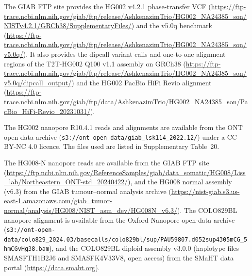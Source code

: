 The GIAB FTP site provides the HG002 v4.2.1 phase-transfer VCF (\url{https://ftp-trace.ncbi.nlm.nih.gov/giab/ftp/release/AshkenazimTrio/HG002_NA24385_son/NISTv4.2.1/GRCh38/SupplementaryFiles/}) and the v5.0q benchmark (\url{https://ftp-trace.ncbi.nlm.nih.gov/giab/ftp/release/AshkenazimTrio/HG002_NA24385_son/v5.0q/}). It also provides the dipcall variant calls and one-to-one alignment regions of the T2T-HG002 Q100 v1.1 assembly on GRCh38 (\url{https://ftp-trace.ncbi.nlm.nih.gov/giab/ftp/release/AshkenazimTrio/HG002_NA24385_son/v5.0q/dipcall_output/}) and the HG002 PacBio HiFi Revio alignment (\url{https://ftp-trace.ncbi.nlm.nih.gov/giab/ftp/data/AshkenazimTrio/HG002_NA24385_son/PacBio_HiFi-Revio_20231031/}).

The HG002 nanopore R10.4.1 reads and alignments are available from the ONT open-data archive (\texttt{s3://ont-open-data/giab\_lsk114\_2022.12/}) under a CC BY-NC 4.0 licence. The files used are listed in Supplementary Table~20.

The HG008-N nanopore reads are available from the GIAB FTP site (\url{https://ftp.ncbi.nlm.nih.gov/ReferenceSamples/giab/data_somatic/HG008/Liss_lab/Northeastern_ONT-std_20240422/}), and the HG008 normal assembly (v6.3) from the GIAB tumour--normal analysis archive (\url{https://nist-giab.s3.us-east-1.amazonaws.com/giab_tumor-normal/analysis/HG008/NIST_asm_dev/HG008N_v6.3/}).  The COLO829BL nanopore alignment is available from the Oxford Nanopore open-data archive (\texttt{s3://ont-open-data/colo829\_2024.03/basecalls/colo829bl/sup/PAU59807.d052sup4305mCG\_5hmCGvHg38.bam}), and the COLO829BL diploid assembly v3.0.0 (haplotype files SMASFTH1B2J6 and SMASFK4V33V8, open access) from the SMaHT data portal (\url{https://data.smaht.org}).


